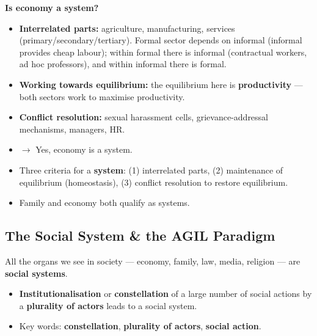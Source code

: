 \begin{ComparisonBox}
\textbf{Is economy a system?}
\begin{itemize}
\item \textbf{Interrelated parts:} agriculture, manufacturing, services (primary/secondary/tertiary). Formal sector depends on informal (informal provides cheap labour); within formal there is informal (contractual workers, ad hoc professors), and within informal there is formal.
\item \textbf{Working towards equilibrium:} the equilibrium here is \textbf{productivity} --- both sectors work to maximise productivity.
\item \textbf{Conflict resolution:} sexual harassment cells, grievance-addressal mechanisms, managers, HR.
\item $\rightarrow$ Yes, economy is a system.
\end{itemize}
\end{ComparisonBox}

\begin{QuickRevision}
\begin{itemize}
\item Three criteria for a \textbf{system}: (1) interrelated parts, (2) maintenance of equilibrium (homeostasis), (3) conflict resolution to restore equilibrium.
\item Family and economy both qualify as systems.
\end{itemize}
\end{QuickRevision}

\sectiondivider

\subsection{The Social System \& the AGIL Paradigm}

All the organs we see in society --- economy, family, law, media, religion --- are \textbf{social systems}.

\begin{KeyConcept}
\begin{itemize}
\item \textbf{Institutionalisation} or \textbf{constellation} of a large number of social actions by a \textbf{plurality of actors} leads to a social system.
\item Key words: \textbf{constellation}, \textbf{plurality of actors}, \textbf{social action}.
\end{itemize}
\end{KeyConcept}

